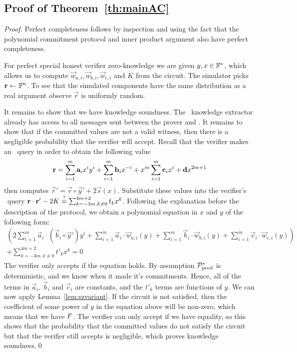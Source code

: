 \subsection{Proof of Theorem~\ref{th:mainAC}}\label{ap:proofAC}
\begin{proof}
Perfect completeness follows by inspection and using the fact that the polynomial commitment protocol  and inner product argument also have perfect completeness.

For perfect special honest verifier zero-knowledge we are given $y,x\in \F^*$, which allows us to compute $\vec{w}_{a,i},\vec{w}_{b,i},\vec{w}_{c,i}$ and $K$ from the circuit. The simulator picks $\vec{r}\gets \F^n$. To see that the simulated components have the same distribution as a real argument observe $\vec{r}$ is uniformly random.

It remains to show that we have knowledge soundness. The \ILC\ knowledge extractor already has access to all messages sent between the prover and \ILC. It remains to show that if the committed values are not a valid witness, then there is a negligible probability that the verifier will accept.
Recall that the verifier makes an \ILCopen\ query in order to obtain the following value
\[
\vec{r} =\sum_{i=1}^m\vec{a}_{i}x^{i} y^i+\sum_{i=1}^m\vec{b}_{i} x^{-i}+x^m \sum_{i=1}^m\vec{c}_{i} x^{i}+\vec{d}x^{2m+1}\\
\]
then computes $\vec{r}'=\vec{r}\circ \vec{y}' +2\vec{s}(x)$. Substitute these values into the verifier's \ILCcheck\ query $\vec{r}\cdot \vec{r}'-2K \vereq \sum_{k=-3m,k \neq 0}^{4m+2}t_k x^{k}$.
Following the explanation before the description of the protocol, we obtain a polynomial equation in $x$ and $y$ of the following form:
\begin{align*}
\left(2 \sum_{i=1}^m  \vec{a}_i  \cdot (\vec{b}_i \circ \vec{y}') y^i + \sum_{i=1}^m \vec{a}_i  \cdot \vec{w}_{a,i}(y)  +\sum_{i=1}^m \vec{b}_i \cdot \vec{w}_{b,i}(y)   +\sum_{i=1}^m \vec{c}_i \cdot \vec{w}_{c,i}(y)\right) \\
+ \sum_{k=-3m,k \neq 0}^{4m+2}t'_k x^{k} = 0
\end{align*}
The verifier only accepts if the equation holds. By assumption $\PoProdMal$ is deterministic, and we know when it made it's commitments. Hence, all of the terms in $\vec{a}_i$, $\vec{b}_i$ and $\vec{c}_i$ are constants, and the $t'_k$ terms are functions of $y$. We can now apply Lemma~\ref{lem:szvariant}. If the circuit is not satisfied, then the coefficient of some power of $y$ in the equation above will be non-zero, which means that we have $\eventsz$. The verifier can only accept if we have equality, so this shows that the probability that the committed values do not satisfy the circuit but that the verifier still accepts is negligible, which proves knowledge soundness.\qed
\end{proof}

